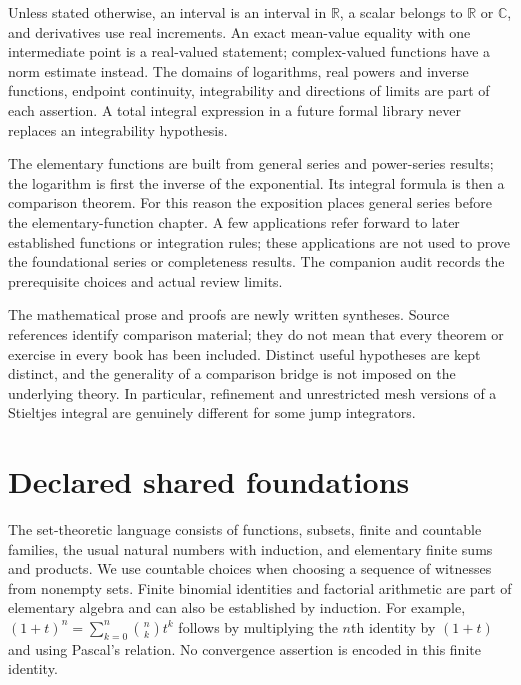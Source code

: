 \documentclass[11pt,oneside,a4paper]{book}
\theoremstyle{definition}
\theoremstyle{remark}
\newcommand{\R}{\mathbb R}
\newcommand{\C}{\mathbb C}
\begin{document}
Unless stated otherwise, an interval is an interval in $\R$, a scalar belongs to
$\R$ or $\C$, and derivatives use real increments. An exact mean-value equality
with one intermediate point is a real-valued statement; complex-valued functions
have a norm estimate instead. The domains of logarithms, real powers and inverse
functions, endpoint continuity, integrability and directions of limits are part
of each assertion. A total integral expression in a future formal library never
replaces an integrability hypothesis.

The elementary functions are built from general series and power-series results;
the logarithm is first the inverse of the exponential. Its integral formula is
then a comparison theorem. For this reason the exposition places general series
before the elementary-function chapter. A few applications refer forward to
later established functions or integration rules; these applications are not
used to prove the foundational series or completeness results. The companion
audit records the prerequisite choices and actual review limits.

The mathematical prose and proofs are newly written syntheses. Source references
identify comparison material; they do not mean that every theorem or exercise in
every book has been included. Distinct useful hypotheses are kept distinct, and
the generality of a comparison bridge is not imposed on the underlying theory.
In particular, refinement and unrestricted mesh versions of a Stieltjes integral
are genuinely different for some jump integrators.


\mainmatter

\chapter*{Declared shared foundations}
\label{shared-foundations}
The set-theoretic language consists of functions, subsets, finite and countable
families, the usual natural numbers with induction, and elementary finite sums
and products. We use countable choices when choosing a sequence of witnesses
from nonempty sets. Finite binomial identities and factorial arithmetic are part
of elementary algebra and can also be established by induction. For example,
$(1+t)^n=\sum_{k=0}^n\binom nk t^k$ follows by multiplying the $n$th identity by
$(1+t)$ and using Pascal's relation. No convergence assertion is encoded in this
finite identity.
\end{document}
